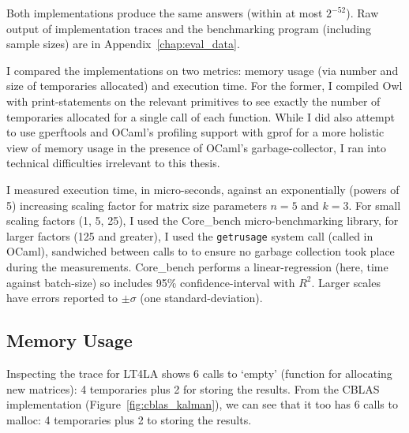 Both implementations produce the same answers (within at most $2^{-52}$). Raw
output of implementation traces and the benchmarking program (including sample
sizes) are in Appendix~\ref{chap:eval_data}.

I compared the implementations on two metrics: memory usage (via number and
size of temporaries allocated) and execution time. For the former, I compiled
Owl with print-statements on the relevant primitives to see exactly the number
of temporaries allocated for a single call of each function. While I did also
attempt to use gperftools and OCaml's profiling support with gprof for a more
holistic view of memory usage in the presence of OCaml's garbage-collector, I
ran into technical difficulties irrelevant to this thesis.

I measured execution time, in micro-seconds, against an exponentially (powers
of 5) increasing scaling factor for matrix size parameters $n=5$ and $k=3$.
For small scaling factors (1, 5, 25), I used the Core\_bench micro-benchmarking
library, for larger factors (125 and greater), I used the \texttt{getrusage}
system call (called  in OCaml), sandwiched between calls to
 to ensure no garbage collection took place during the
measurements.  Core\_bench performs a linear-regression (here, time against
batch-size) so includes 95\% confidence-interval with $R^2$. Larger scales have
errors reported to $\pm \sigma$ (one standard-deviation).

\subsection{Memory Usage}

Inspecting the trace for LT4LA shows 6 calls to `empty' (function for
allocating new matrices): 4 temporaries plus 2 for storing the results. From
the CBLAS implementation (Figure~\ref{fig:cblas_kalman}), we can see that it
too has 6 calls to malloc: 4 temporaries plus 2 to storing the results.

